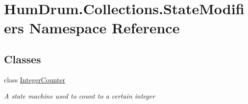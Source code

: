 \hypertarget{namespaceHumDrum_1_1Collections_1_1StateModifiers}{}\section{Hum\+Drum.\+Collections.\+State\+Modifiers Namespace Reference}
\label{namespaceHumDrum_1_1Collections_1_1StateModifiers}
\subsection*{Classes}
\begin{DoxyCompactItemize}
\item 
class \hyperlink{classHumDrum_1_1Collections_1_1StateModifiers_1_1IntegerCounter}{Integer\+Counter}
\begin{DoxyCompactList}\small\item\em A state machine used to count to a certain integer \end{DoxyCompactList}\end{DoxyCompactItemize}
